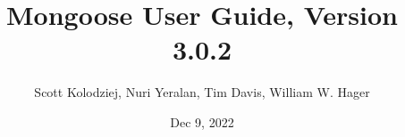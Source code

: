 \title{Mongoose User Guide, Version 3.0.2}
\author{Scott Kolodziej, Nuri Yeralan, Tim Davis, William W. Hager}
\date{Dec 9, 2022}
